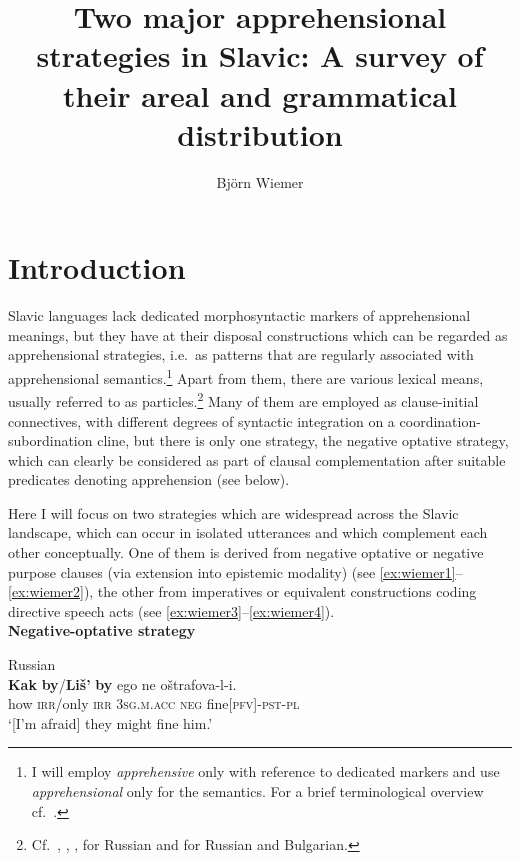 \documentclass[output=paper,colorlinks,citecolor=brown]{langscibook}
\author{Björn Wiemer\affiliation{Johannes-Gutenberg-Universität Mainz}}
\title[Two major apprehensional strategies in Slavic]
      {Two major apprehensional strategies in Slavic: A survey of their areal and grammatical distribution}
\begin{document}
\maketitle 


\section{Introduction}
\label{sec:intro}

Slavic languages lack dedicated morphosyntactic markers of apprehensional meanings, but they have at their disposal constructions which can be regarded as apprehensional strategies, i.e.\ as patterns that are regularly associated with apprehensional semantics.\footnote{I will employ \textit{apprehensive} only with reference to dedicated markers and use \textit{apprehensional} only for the semantics. For a brief terminological overview cf.\ \citet[59]{MitkovskaEtAl2017}.} Apart from them, there are various lexical means, usually referred to as particles.\footnote{Cf.\ \citet[46--47]{Dobrushina2006wiemer}, \citet{Arkadiev2007}, \citet[448]{Plungian2011}, \citet{Mikaelian2021} for Russian and \citet{Ivanova2014} for Russian and Bulgarian.} Many of them are employed as clause-initial connectives, with different degrees of syntactic integration on a coordination-subordination cline, but there is only one strategy, the negative optative strategy, which can clearly be considered as part of clausal complementation after suitable predicates denoting apprehension (see  below).

Here I will focus on two strategies which are widespread across the Slavic landscape, which can occur in isolated utterances and which complement each other conceptually. One of them is derived from negative optative or negative purpose clauses (via extension into epistemic modality) (see \ref{ex:wiemer1}--\ref{ex:wiemer2}), the other from imperatives or equivalent constructions coding directive speech acts (see \ref{ex:wiemer3}--\ref{ex:wiemer4}). \\

\noindent \textbf{Negative-optative strategy}

\ea\label{ex:wiemer1} \textnormal{Russian} \\
\gll \textbf{Kak} \textbf{by}\textnormal{/}\textbf{Liš'} \textbf{by} ego ne oštrafova-l-i. \\
how \textsc{irr}/only \textsc{irr} \textsc{3sg.m.acc} \textsc{neg} fine\textsc{[pfv]-pst-pl} \\
\glt `[I'm afraid] they might fine him.'
\z 
\end{document}
